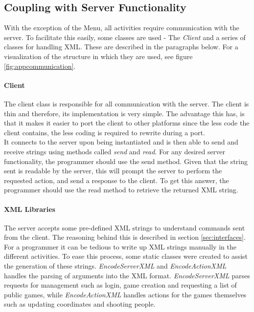 \subsection{Coupling with Server Functionality} \label{subsec:server-coupling}
With the exception of the Menu, all activities require communication with the server. To facilitate this easily, some classes are used - The \textit{Client} and a series of classes for handling XML. These are described in the paragraphs below. For a visualization of the structure in which they are used, see figure \ref{fig:appcommunication}.

\paragraph{Client}
The client class is responsible for all communication with the server. The client is thin and therefore, its implementation is very simple. The advantage this has, is that it makes it easier to port the client to other platforms since the less code the client contains, the less coding is required to rewrite during a port.\\

It connects to the server upon being instantiated and is then able to send and receive strings using methods called \textit{send} and \textit{read}. For any desired server functionality, the programmer should use the send method. Given that the string sent is readable by the server, this will prompt the server to perform the requested action, and send a response to the client. To get this answer, the programmer should use the read method to retrieve the returned XML string.

\paragraph{XML Libraries}
The server accepts some pre-defined XML strings to understand commands sent from the client. The reasoning behind this is described in section \ref{sec:interfaces}. For a programmer it can be tedious to write up XML strings manually in the different activities. To ease this process, some static classes were created to assist the generation of these strings. \textit{EncodeServerXML} and \textit{EncodeActionXML} handles the parsing of arguments into the XML format. \textit{EncodeServerXML} parses requests for management such as login, game creation and requesting a list of public games, while \textit{EncodeActionXML} handles actions for the games themselves such as updating coordinates and shooting people.

